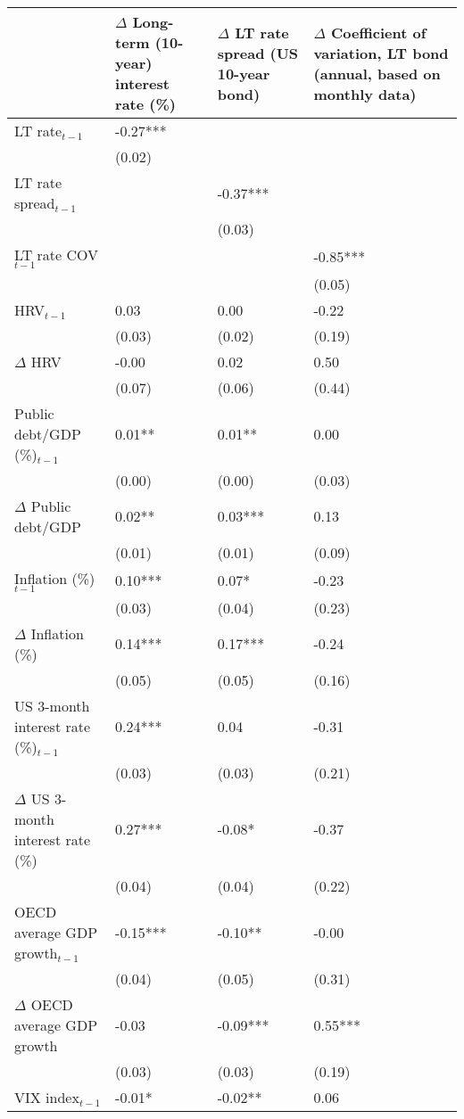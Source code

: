 {\tiny
\begin{tabular}{lp{2cm}p{2cm}p{2cm}}
  \hline
 & $\Delta$ Long-term (10-year) interest rate (\%) & $\Delta$ LT rate spread (US 10-year bond) & $\Delta$ Coefficient of variation, LT bond (annual, based on monthly data) \\ 
  \hline
LT rate$_{t-1}$ & -0.27*** &  &  \\ 
   & (0.02) &  &  \\ 
  LT rate spread$_{t-1}$ &  & -0.37*** &  \\ 
   &  & (0.03) &  \\ 
  LT rate COV$_{t-1}$ &  &  & -0.85*** \\ 
   &  &  & (0.05) \\ 
  HRV$_{t-1}$ & 0.03 & 0.00 & -0.22 \\ 
   & (0.03) & (0.02) & (0.19) \\ 
  $\Delta$ HRV & -0.00 & 0.02 & 0.50 \\ 
   & (0.07) & (0.06) & (0.44) \\ 
  Public debt/GDP (\%)$_{t-1}$ & 0.01** & 0.01** & 0.00 \\ 
   & (0.00) & (0.00) & (0.03) \\ 
  $\Delta$ Public debt/GDP & 0.02** & 0.03*** & 0.13 \\ 
   & (0.01) & (0.01) & (0.09) \\ 
  Inflation (\%) $_{t-1}$ & 0.10*** & 0.07* & -0.23 \\ 
   & (0.03) & (0.04) & (0.23) \\ 
  $\Delta$ Inflation (\%) & 0.14*** & 0.17*** & -0.24 \\ 
   & (0.05) & (0.05) & (0.16) \\ 
  US 3-month interest rate (\%)$_{t-1}$ & 0.24*** & 0.04 & -0.31 \\ 
   & (0.03) & (0.03) & (0.21) \\ 
  $\Delta$ US 3-month interest rate (\%) & 0.27*** & -0.08* & -0.37 \\ 
   & (0.04) & (0.04) & (0.22) \\ 
  OECD average GDP growth$_{t-1}$ & -0.15*** & -0.10** & -0.00 \\ 
   & (0.04) & (0.05) & (0.31) \\ 
  $\Delta$ OECD average GDP growth & -0.03 & -0.09*** & 0.55*** \\ 
   & (0.03) & (0.03) & (0.19) \\ 
  VIX index$_{t-1}$ & -0.01* & -0.02** & 0.06 \\ 

\end{tabular}}
